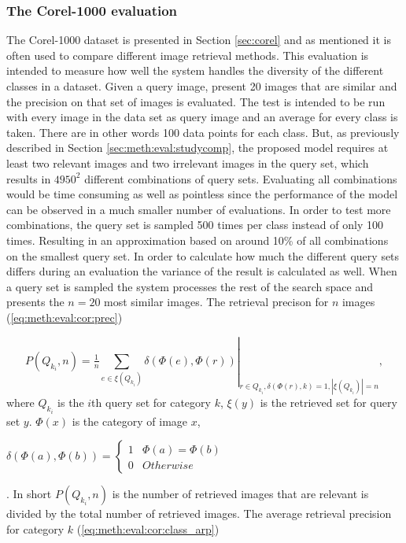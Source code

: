 \subsubsection{The Corel-1000 evaluation}
\label{sec:meth:eval:studycomp:corel}

The Corel-1000 dataset is presented in Section \ref{sec:corel} and as mentioned it is often used to compare different image retrieval methods. This evaluation is intended to measure how well the system handles the diversity of the different classes in a dataset. Given a query image, present 20 images that are similar and the precision on that set of images is evaluated. The test is intended to be run with every image in the data set as query image and an average for every class is taken. There are in other words 100 data points for each class. But, as previously described in Section \ref{sec:meth:eval:studycomp}, the proposed model requires at least two relevant images and two irrelevant images in the query set, which results in $4950^2$ different combinations of query sets. Evaluating all combinations would be time consuming as well as pointless since the performance of the model can be observed in a much smaller number of evaluations. In order to test more combinations, the query set is sampled 500 times per class instead of only 100 times. Resulting in an approximation based on around 10\% of all combinations on the smallest query set. In order to calculate how much the different query sets differs during an evaluation the variance of the result is calculated as well. When a query set is sampled the system processes the rest of the search space and presents the $n=20$ most similar images. The retrieval precison for $n$ images (\ref{eq:meth:eval:cor:prec})

\begin{equation}
\label{eq:meth:eval:cor:prec}
P(Q_{k_i}, n) = \left . \tfrac{1}{n}\sum_{e \in \xi(Q_{k_i})} \delta(\Phi(e), \Phi(r)) \right |_{ r \in Q_{k_i},  \delta(\Phi(r), k)=1, |\xi(Q_{k_i})|=n},
\end{equation}
where $Q_{k_i}$ is the $i$th query set for category $k$, $\xi(y)$ is the retrieved set for query set $y$. $\Phi(x)$ is the category of image $x$, \begin{tiny}$\delta(\Phi(a), \Phi(b)) = \left \{ 
\begin{matrix} 
1 & \Phi(a) = \Phi(b) \\
0 & Otherwise
\end{matrix}\right.$\end{tiny}.
 In short $P(Q_{k_i}, n)$ is the number of retrieved images that are relevant is divided by the total number of retrieved images. 
 The average retrieval precision for category $k$ (\ref{eq:meth:eval:cor:class_arp}) 


